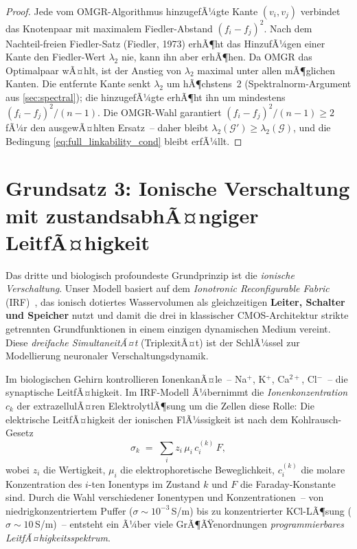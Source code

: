 ﻿\documentclass[12pt, a4paper, openany]{report}
\newcommand{\calG}{\mathcal{G}}
\begin{document}
\begin{proof}
Jede vom OMGR-Algorithmus hinzugefÃ¼gte Kante $(v_i, v_j)$ verbindet das
Knotenpaar mit maximalem Fiedler-Abstand $(f_i - f_j)^2$.  Nach dem
Nachteil-freien Fiedler-Satz (Fiedler, 1973) erhÃ¶ht das HinzufÃ¼gen einer
Kante den Fiedler-Wert $\lambda_2$ nie, kann ihn aber erhÃ¶hen.  Da OMGR
das Optimalpaar wÃ¤hlt, ist der Anstieg von $\lambda_2$ maximal unter allen
mÃ¶glichen Kanten.  Die entfernte Kante senkt $\lambda_2$ um hÃ¶chstens~2
(Spektralnorm-Argument aus \cref{sec:spectral}); die hinzugefÃ¼gte erhÃ¶ht
ihn um mindestens $(f_i - f_j)^2 / (n-1)$.  Die OMGR-Wahl garantiert
$(f_i - f_j)^2 / (n-1) \geq 2$ fÃ¼r den ausgewÃ¤hlten Ersatz~-- daher bleibt
$\lambda_2(\calG') \geq \lambda_2(\calG)$, und die Bedingung
\eqref{eq:full_linkability_cond} bleibt erfÃ¼llt.
\end{proof}

\section{Grundsatz 3: Ionische Verschaltung mit zustandsabhÃ¤ngiger LeitfÃ¤higkeit}
\label{sec:bio_ionic}

Das dritte und biologisch profoundeste Grundprinzip ist die \emph{ionische
Verschaltung}.  Unser Modell basiert auf dem \emph{Ionotronic Reconfigurable
Fabric} (IRF)~\cite{epp2026iono}, das ionisch dotiertes Wasservolumen als
gleichzeitigen \textbf{Leiter, Schalter und Speicher} nutzt und damit die
drei in klassischer CMOS-Architektur strikte getrennten Grundfunktionen in
einem einzigen dynamischen Medium vereint.  Diese \emph{dreifache
SimultaneitÃ¤t} (TriplexitÃ¤t) ist der SchlÃ¼ssel zur Modellierung neuronaler
Verschaltungsdynamik.

Im biologischen Gehirn kontrollieren Ionen\-kanÃ¤le~-- Na$^+$, K$^+$,
Ca$^{2+}$, Cl$^-$~-- die synaptische LeitfÃ¤higkeit.  Im IRF-Modell
Ã¼bernimmt die \emph{Ionenkonzentration} $c_k$ der extrazellulÃ¤ren Elektrolyt\-lÃ¶sung
um die Zellen diese Rolle: Die elektrische LeitfÃ¤higkeit der ionischen
FlÃ¼ssigkeit ist nach dem Kohlrausch-Gesetz~\cite{epp2026iono}
\begin{equation}
  \label{eq:iono_conductivity}
  \sigma_k \;=\; \sum_i z_i \,\mu_i \,c_i^{(k)}\, F,
\end{equation}
wobei $z_i$ die Wertigkeit, $\mu_i$ die elektrophoretische Beweglichkeit,
$c_i^{(k)}$ die molare Konzentration des $i$-ten Ionentyps im Zustand $k$
und $F$ die Faraday-Konstante sind.  Durch die Wahl verschiedener Ionentypen
und Konzentrationen~-- von nied\-rig\-konzentriertem Puffer ($\sigma \sim
10^{-3}$\,S/m) bis zu konzentrierter KCl-LÃ¶sung ($\sigma \sim 10$\,S/m)~--
entsteht ein Ã¼ber viele GrÃ¶ÃŸenordnungen \emph{programmierbares
LeitfÃ¤higkeitsspektrum}.
\end{document}
